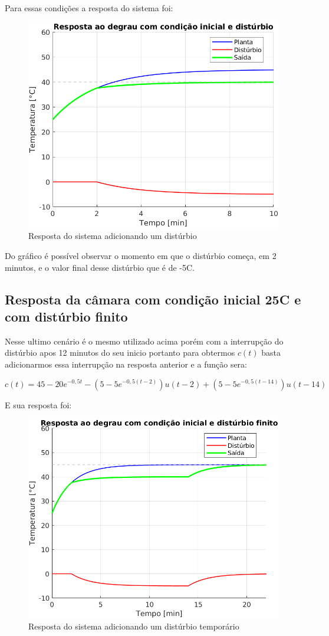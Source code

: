 \documentclass[a4paper,12pt]{article}
\begin{document}
		Para essas condições a resposta do sistema foi:
		
		\begin{figure}[H]
			\centering
			\includegraphics[width=0.5\linewidth]{images/respd.png}
			\caption{Resposta do sistema adicionando um distúrbio}
						
			\label{fig:resposta_d}
		\end{figure}
	
		Do gráfico é possível observar o momento em que o distúrbio começa, em 2 minutos, e o valor final desse distúrbio que é de -5\degree C.
		
	\subsection{Resposta da câmara com condição inicial 25\degree C e com distúrbio finito}
		Nesse ultimo cenário é o mesmo utilizado acima porém com a interrupção do distúrbio apos 12 minutos do seu inicio portanto para obtermos $c(t)$ basta adicionarmos essa interrupção na resposta anterior e a função sera:
		
		\begin{equation}
			c(t) = 45 - 20e^{-0,5t} - (5 - 5e^{-0,5(t-2)})u(t-2) + (5 - 5e^{-0,5(t-14)})u(t-14)
		\end{equation}
	
		E sua resposta foi:
		
		\begin{figure}[H]
			\centering
			\includegraphics[width=0.5\linewidth]{images/respe.png}
			\caption{Resposta do sistema adicionando um distúrbio temporário}
			\label{fig:resposta_e}
		\end{figure}
	
\end{document}
